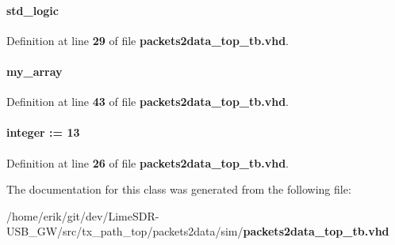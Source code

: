 \paragraph[{reset\+\_\+n}]{ {\bfseries \textcolor{comment}{std\+\_\+logic}\textcolor{vhdlchar}{ }} \hspace{0.3cm}{\ttfamily [Signal]}}\label{classpackets2data__top__tb_1_1tb__behave_a1f070fd63a3a7fa45c907335ea870c5b}


Definition at line {\bf 29} of file {\bf packets2data\+\_\+top\+\_\+tb.\+vhd}.

\paragraph[{smpl\+\_\+nr\+\_\+array}]{ {\bfseries {\bfseries {\bf my\+\_\+array}} \textcolor{vhdlchar}{ }} \hspace{0.3cm}{\ttfamily [Signal]}}\label{classpackets2data__top__tb_1_1tb__behave_a0e622cf025633cca28b05e19818305a6}


Definition at line {\bf 43} of file {\bf packets2data\+\_\+top\+\_\+tb.\+vhd}.

\paragraph[{smpl\+\_\+nr\+\_\+delay}]{ {\bfseries \textcolor{comment}{integer}\textcolor{vhdlchar}{ }\textcolor{vhdlchar}{ }\textcolor{vhdlchar}{\+:}\textcolor{vhdlchar}{=}\textcolor{vhdlchar}{ }\textcolor{vhdlchar}{ } \textcolor{vhdldigit}{13} \textcolor{vhdlchar}{ }} \hspace{0.3cm}{\ttfamily [Constant]}}\label{classpackets2data__top__tb_1_1tb__behave_a3ad3bb7316b276692688d9baee9662b8}


Definition at line {\bf 26} of file {\bf packets2data\+\_\+top\+\_\+tb.\+vhd}.



The documentation for this class was generated from the following file\+:\begin{DoxyCompactItemize}
\item 
/home/erik/git/dev/\+Lime\+S\+D\+R-\/\+U\+S\+B\+\_\+\+G\+W/src/tx\+\_\+path\+\_\+top/packets2data/sim/{\bf packets2data\+\_\+top\+\_\+tb.\+vhd}\end{DoxyCompactItemize}
